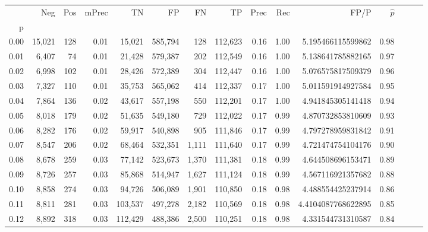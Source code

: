 \begin{tabular}{rrrrrrrrrrrrrrr}
\toprule
{} &     Neg &    Pos & mPrec &       TN &       FP &       FN &       TP &  Prec &   Rec &                  FP/P & $\hat{p}$ \\
p    &         &        &       &          &          &          &          &       &       &                       &           \\
\midrule
0.00 &  15,021 &    128 &  0.01 &   15,021 &  585,794 &      128 &  112,623 &  0.16 &  1.00 &     5.195466115599862 &      0.98 \\
0.01 &   6,407 &     74 &  0.01 &   21,428 &  579,387 &      202 &  112,549 &  0.16 &  1.00 &     5.138641785882165 &      0.97 \\
0.02 &   6,998 &    102 &  0.01 &   28,426 &  572,389 &      304 &  112,447 &  0.16 &  1.00 &     5.076575817509379 &      0.96 \\
0.03 &   7,327 &    110 &  0.01 &   35,753 &  565,062 &      414 &  112,337 &  0.17 &  1.00 &     5.011591914927584 &      0.95 \\
0.04 &   7,864 &    136 &  0.02 &   43,617 &  557,198 &      550 &  112,201 &  0.17 &  1.00 &     4.941845305141418 &      0.94 \\
0.05 &   8,018 &    179 &  0.02 &   51,635 &  549,180 &      729 &  112,022 &  0.17 &  0.99 &     4.870732853810609 &      0.93 \\
0.06 &   8,282 &    176 &  0.02 &   59,917 &  540,898 &      905 &  111,846 &  0.17 &  0.99 &     4.797278959831842 &      0.91 \\
0.07 &   8,547 &    206 &  0.02 &   68,464 &  532,351 &    1,111 &  111,640 &  0.17 &  0.99 &     4.721474754104176 &      0.90 \\
0.08 &   8,678 &    259 &  0.03 &   77,142 &  523,673 &    1,370 &  111,381 &  0.18 &  0.99 &     4.644508696153471 &      0.89 \\
0.09 &   8,726 &    257 &  0.03 &   85,868 &  514,947 &    1,627 &  111,124 &  0.18 &  0.99 &     4.567116921357682 &      0.88 \\
0.10 &   8,858 &    274 &  0.03 &   94,726 &  506,089 &    1,901 &  110,850 &  0.18 &  0.98 &     4.488554425237914 &      0.86 \\
0.11 &   8,811 &    281 &  0.03 &  103,537 &  497,278 &    2,182 &  110,569 &  0.18 &  0.98 &    4.4104087768622895 &      0.85 \\
0.12 &   8,892 &    318 &  0.03 &  112,429 &  488,386 &    2,500 &  110,251 &  0.18 &  0.98 &     4.331544731310587 &      0.84 \\

\end{tabular}

